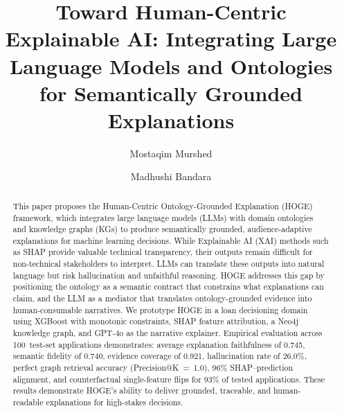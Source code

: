 \documentclass[lnbip]{svmultln}
\begin{document}
%
\mainmatter              %
%
\title{Toward Human-Centric Explainable AI: Integrating Large Language Models and Ontologies for Semantically Grounded Explanations}
%
%
\author{Mostaqim Murshed \and Madhushi Bandara}
%
%
%

\maketitle

\begin{abstract}
This paper proposes the Human-Centric Ontology-Grounded Explanation (HOGE) framework, which integrates large language models (LLMs) with domain ontologies and knowledge graphs (KGs) to produce semantically grounded, audience-adaptive explanations for machine learning decisions. While Explainable AI (XAI) methods such as SHAP provide valuable technical transparency, their outputs remain difficult for non-technical stakeholders to interpret. LLMs can translate these outputs into natural language but risk hallucination and unfaithful reasoning. HOGE addresses this gap by positioning the ontology as a semantic contract that constrains what explanations can claim, and the LLM as a mediator that translates ontology-grounded evidence into human-consumable narratives. We prototype HOGE in a loan decisioning domain using XGBoost with monotonic constraints, SHAP feature attribution, a Neo4j knowledge graph, and GPT-4o as the narrative explainer. Empirical evaluation across 100~test-set applications demonstrates: average explanation faithfulness of 0.745, semantic fidelity of 0.740, evidence coverage of 0.921, hallucination rate of 26.0\%, perfect graph retrieval accuracy (Precision@K~=~1.0), 96\% SHAP--prediction alignment, and counterfactual single-feature flips for 93\% of tested applications. These results demonstrate HOGE's ability to deliver grounded, traceable, and human-readable explanations for high-stakes decisions.
\end{abstract}
%
\end{document}
